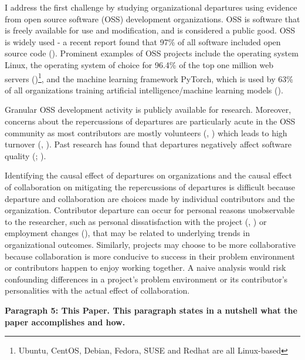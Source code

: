 \documentclass[12pt,notitlepage]{article}
\begin{document}
I address the first challenge by studying organizational departures using evidence from open source software (OSS) development organizations. OSS is software that is freely available for use and modification, and is considered a public good. OSS is widely used - a recent report found that 97\% of all software included open source code (\cite{fred_bals_six_2025}). Prominent examples of OSS projects include the operating system Linux, the operating system of choice for 96.4\% of the top one million web servers (\cite{w3cook_os_2015})\footnote{Ubuntu, CentOS, Debian, Fedora, SUSE and Redhat are all Linux-based}, and the machine learning framework PyTorch, which is used by 63\% of all organizations training artificial intelligence/machine learning models (\cite{lawson_shaping_2024}). 

Granular OSS development activity is publicly available for research. Moreover, concerns about the repercussions of departures are particularly acute in the OSS community as most contributors are mostly volunteers (\cite{robles_evolution_2005}, \cite{xu_volunteers_2010}) which leads to high turnover (\cite{izquierdo-cortazar_using_2009}, \cite{rashid_systematic_2019}). Past research has found that departures negatively affect software quality (\cite{mockus_organizational_2010}; \cite{foucault_impact_2015}).

Identifying the causal effect of departures on organizations and the causal effect of collaboration on mitigating the repercussions of departures is difficult because departure and collaboration are choices made by individual contributors and the organization. Contributor departure can occur for personal reasons unobservable to the researcher, such as personal dissatisfaction with the project (\cite{hannon_retaining_2008}, \cite{yu_empirical_2012}) or employment changes (\cite{miller_why_2019}), that may be related to underlying trends in organizational outcomes. Similarly, projects may choose to be more collaborative because collaboration is more conducive to success in their problem environment or contributors happen to enjoy working together. A naive analysis would risk confounding differences in a project's problem environment or its contributor's personalities with the actual effect of collaboration. 


\textbf{Paragraph 5: This Paper. This paragraph states in a nutshell what the paper accomplishes and how. }
\end{document}
